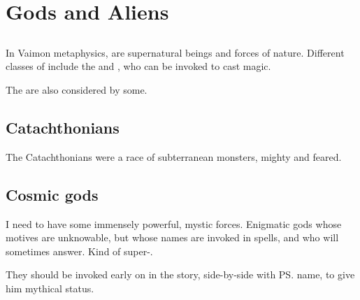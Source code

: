 \chapter{Gods and Aliens}















\section{\Archon}
In Vaimon metaphysics, \Archons{} are supernatural beings and forces of nature. 
Different classes of \Archons{} include the  and , who can be invoked to cast magic. 

The  are also considered \Archons by some. 















\section{Catachthonians}
The Catachthonians were a race of subterranean monsters, mighty and feared. 















\section{Cosmic gods}
I need to have some immensely powerful, mystic forces. Enigmatic gods whose motives are unknowable, but whose names are invoked in spells, and who will sometimes answer. Kind of super-\Qliphoth. 

They should be invoked early on in the story, side-by-side with \ps{\Ishnaruchaefir} name, to give him mythical status. 

